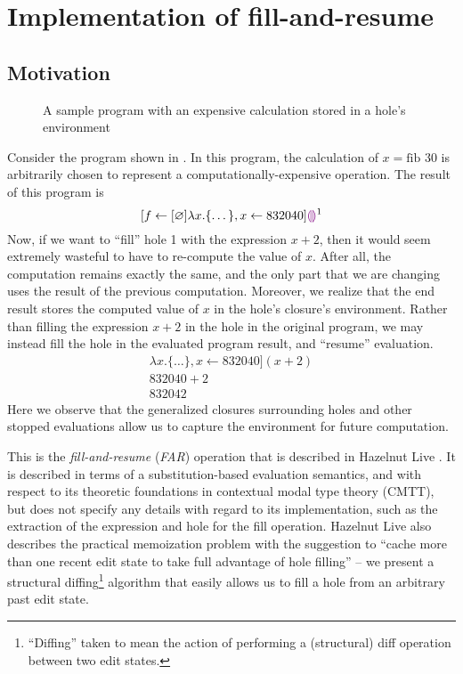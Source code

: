 \chapter{Implementation of fill-and-resume}
\label{sec:far_impl}

\section{Motivation}
\label{sec:far-motivation}

\begin{figure}
  \centering
  \caption{A sample program with an expensive calculation stored in a hole's environment}
  \label{fig:far-motivation}
\end{figure}

Consider the program shown in . In this program, the calculation of $x=\text{fib }30$ is arbitrarily chosen to represent a computationally-expensive operation. The result of this program is \[
  [f\leftarrow [\varnothing]\lambda x.\{\dots\},x\leftarrow 832040]\textcolor{violet}{\llparenthesis}\textcolor{violet}{\rrparenthesis}^1
\]
Now, if we want to ``fill'' hole 1 with the expression $x+2$, then it would seem extremely wasteful to have to re-compute the value of $x$. After all, the computation remains exactly the same, and the only part that we are changing uses the result of the previous computation. Moreover, we realize that the end result stores the computed value of $x$ in the hole's closure's environment. Rather than filling the expression $x+2$ in the hole in the original program, we may instead fill the hole in the evaluated program result, and ``resume'' evaluation.
\begin{gather*}
  [f\leftarrow [\varnothing]\lambda x.\{\dots\},x\leftarrow 832040](x+2) \\
  832040+2 \\
  832042
\end{gather*}
Here we observe that the generalized closures surrounding holes and other stopped evaluations allow us to capture the environment for future computation.

This is the \textit{fill-and-resume} (\textit{FAR}) operation that is described in Hazelnut Live \cite{conf/popl/HazelnutLive19}. It is described in terms of a substitution-based evaluation semantics, and with respect to its theoretic foundations in contextual modal type theory (CMTT), but does not specify any details with regard to its implementation, such as the extraction of the expression and hole for the fill operation. Hazelnut Live also describes the practical memoization problem with the suggestion to ``cache more than one recent edit state to take full advantage of hole filling'' -- we present a structural diffing\footnote{``Diffing'' taken to mean the action of performing a (structural) diff operation between two edit states.} algorithm that easily allows us to fill a hole from an arbitrary past edit state.

